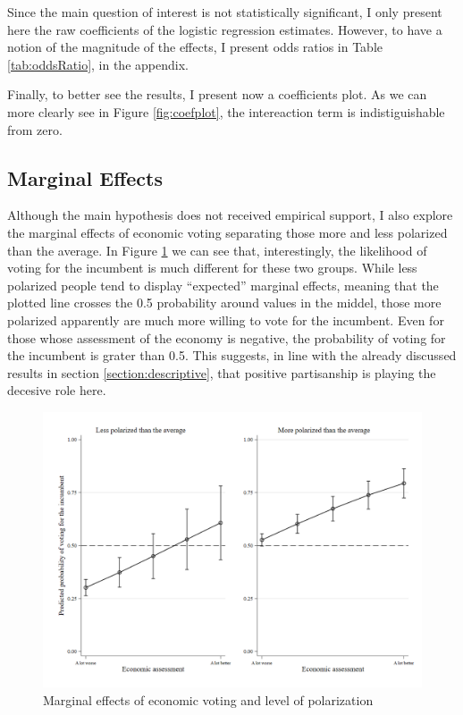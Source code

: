 \documentclass[a4paper, svgnames]{article}
\begin{document}
Since the main question of interest is not statistically significant, I only present here the raw coefficients of the logistic regression estimates. However, to have a notion of the magnitude of the effects, I present odds ratios in Table \ref*{tab:oddsRatio}, in the appendix.

Finally, to better see the results, I present now a coefficients plot. As we can more clearly see in Figure \ref*{fig:coefplot}, the intereaction term is indistiguishable from zero.

\subsection*{Marginal Effects}

Although the main hypothesis does not received empirical support, I also explore the marginal effects of economic voting separating those more and less polarized than the average. In Figure \ref{fig:margins} we can see that, interestingly, the likelihood of voting for the incumbent is much different for these two groups. While less polarized people tend to display ``expected'' marginal effects, meaning that the plotted line crosses the 0.5 probability around values in the middel, those more polarized apparently are much more willing to vote for the incumbent. Even for those whose assessment of the economy is negative, the probability of voting for the incumbent is grater than 0.5. This suggests, in line with the already discussed results in section \ref*{section:descriptive}, that positive partisanship is playing the decesive role here. 


\begin{figure}[H]
\centering
\includegraphics[scale=0.35]{Figures/marginsplot.png}
\caption{\label{fig:margins} Marginal effects of economic voting and level of polarization}
\end{figure}
\end{document}
